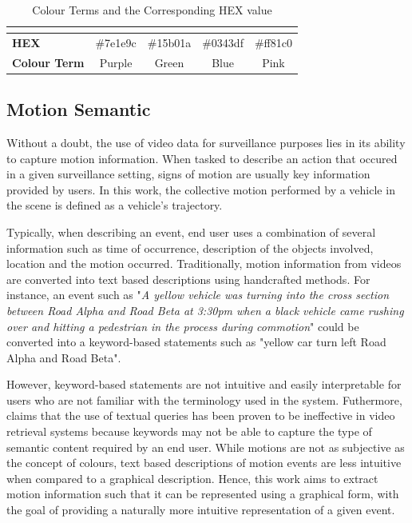 \begin{table}[!ht]
\begin{tabular}{lcccc}
\multicolumn{1}{l|}{}                     & \multicolumn{1}{l|}{\cellcolor[HTML]{7E1E9C}} & \multicolumn{1}{l|}{\cellcolor[HTML]{15B01A}} & \multicolumn{1}{l|}{\cellcolor[HTML]{0343DF}} & \multicolumn{1}{l|}{\cellcolor[HTML]{FF81C0}} \\ \hline
\multicolumn{1}{|l|}{\textbf{HEX}}        & \multicolumn{1}{c|}{\#7e1e9c}                 & \multicolumn{1}{c|}{\#15b01a}                 & \multicolumn{1}{c|}{\#0343df}                 & \multicolumn{1}{c|}{\#ff81c0}                 \\ \hline
\multicolumn{1}{|l|}{\textbf{Colour Term}}  & \multicolumn{1}{c|}{Purple}                   & \multicolumn{1}{c|}{Green}                    & \multicolumn{1}{c|}{Blue}                     & \multicolumn{1}{c|}{Pink}                     \\ \hline
\end{tabular}
\caption{Colour Terms and the Corresponding HEX value}
\label{table:colorshex}
\end{table}



\subsection{Motion Semantic}

Without a doubt, the use of video data for surveillance purposes lies in its ability to capture motion information. When tasked to describe an action that occured in a given surveillance setting, signs of motion are usually key information provided by users. In this work, the collective motion performed by a vehicle in the scene is defined as a vehicle's trajectory.

Typically, when describing an event, end user uses a combination of several information such as time of occurrence, description of the objects involved, location and the motion occurred. Traditionally, motion information from videos are converted into text based descriptions using handcrafted methods. For instance, an event such as "\textit{A yellow vehicle was turning into the cross section between Road Alpha and Road Beta at 3:30pm when a black vehicle came rushing over and hitting a pedestrian in the process during commotion}" could be converted into a keyword-based statements such as "yellow car turn left Road Alpha and Road Beta".

However, keyword-based statements are not intuitive and easily interpretable for users who are not familiar with the terminology used in the system.
Futhermore, \cite{bhaumik2016hybrid} claims that the use of textual queries has been proven to be ineffective in video retrieval systems because keywords may not be able to capture the type of semantic content required by an end user.
While motions are not as subjective as the concept of colours, text based descriptions of motion events are less intuitive when compared to a graphical description.
Hence, this work aims to extract motion information such that it can be represented using a graphical form, with the goal of providing a naturally more intuitive representation of a given event.

